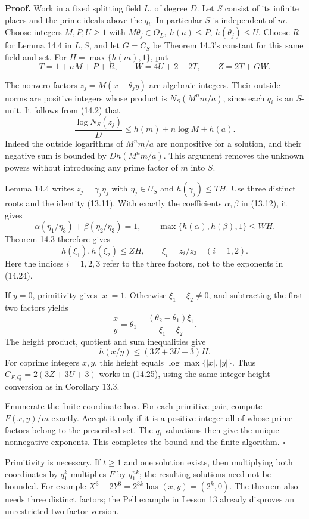 \documentclass[
  11pt,
  a4paper,
]{article}
\begin{document}
\textbf{Proof.} Work in a fixed splitting field \(L\), of degree \(D\).
Let \(S\) consist of its infinite places and the prime ideals above the
\(q_i\). In particular \(S\) is independent of \(m\). Choose integers
\(M,P,U\ge1\) with \(M\theta_j\in O_L,\ h(a)\le P,\ h(\theta_j)\le U\).
Choose \(R\) for Lemma 14.4 in \(L,S\), and let \(G=C_S\) be Theorem
14.3's constant for this same field and set. For \(H=\max\{h(m),1\}\),
put \[
T=1+nM+P+R,\qquad W=4U+2+2T,\qquad Z=2T+GW.
\tag{14.26}
\]

The nonzero factors \(z_j=M(x-\theta_jy)\) are algebraic integers. Their
outside norms are positive integers whose product is \(N_S(M^nm/a)\),
since each \(q_i\) is an \(S\)-unit. It follows from (14.2) that \[
\frac{\log N_S(z_j)}D
\le h(m)+n\log M+h(a).
\tag{14.27}
\] Indeed the outside logarithms of \(M^nm/a\) are nonpositive for a
solution, and their negative sum is bounded by \(D h(M^nm/a)\). This
argument removes the unknown powers without introducing any prime factor
of \(m\) into \(S\).

Lemma 14.4 writes \(z_j=\gamma_j\eta_j\) with \(\eta_j\in U_S\) and
\(h(\gamma_j)\le TH\). Use three distinct roots and the identity
(13.11). With exactly the coefficients \(\alpha,\beta\) in (13.12), it
gives \[
\alpha(\eta_1/\eta_3)+\beta(\eta_2/\eta_3)=1,\qquad
\max\{h(\alpha),h(\beta),1\}\le WH.
\tag{14.28}
\] Theorem 14.3 therefore gives \[
h(\xi_1),h(\xi_2)\le ZH,\qquad
\xi_i=z_i/z_3\quad(i=1,2).
\tag{14.29}
\] Here the indices \(i=1,2,3\) refer to the three factors, not to the
exponents in (14.24).

If \(y=0\), primitivity gives \(|x|=1\). Otherwise \(\xi_1-\xi_2\ne0\),
and subtracting the first two factors yields \[
\frac xy=\theta_1+
       \frac{(\theta_2-\theta_1)\xi_1}{\xi_1-\xi_2}.
\tag{14.30}
\] The height product, quotient and sum inequalities give \[
h(x/y)\le(3Z+3U+3)H.
\tag{14.31}
\] For coprime integers \(x,y\), this height equals
\(\log\max\{|x|,|y|\}\). Thus \(C_{F,Q}=2(3Z+3U+3)\) works in (14.25),
using the same integer-height conversion as in Corollary 13.3.

Enumerate the finite coordinate box. For each primitive pair, compute
\(F(x,y)/m\) exactly. Accept it only if it is a positive integer all of
whose prime factors belong to the prescribed set. The \(q_i\)-valuations
then give the unique nonnegative exponents. This completes the bound and
the finite algorithm. \(\square\)

Primitivity is necessary. If \(t\ge1\) and one solution exists, then
multiplying both coordinates by \(q_1^k\) multiplies \(F\) by
\(q_1^{nk}\); the resulting solutions need not be bounded. For example
\(X^3-2Y^3=2^{3k}\) has \((x,y)=(2^k,0)\). The theorem also needs three
distinct factors; the Pell example in Lesson 13 already disproves an
unrestricted two-factor version.
\end{document}

